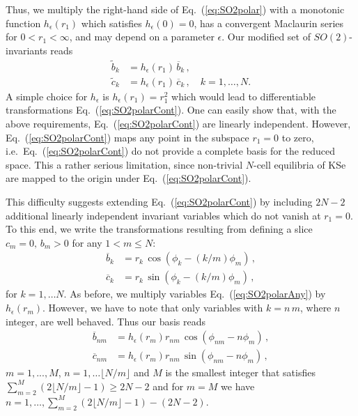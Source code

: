 \documentclass[aip,cha,showpacs,reprint]{revtex4-1} %
\newcommand{\bseq}{\begin{subequations}}
\newcommand{\eseq}{\end{subequations}}
\newcommand{\refeq}  [1] {Eq.~(\ref{#1})}                   %
\newcommand{\ie}{{i.e.}}
\begin{document}
Thus, we multiply the right-hand side of \refeq{eq:SO2polar} with a monotonic function
$h_\epsilon(r_1)$ which satisfies $h_\epsilon(0)=0$,
has a convergent Maclaurin series for $0<r_1<\infty$,
and may depend on a parameter $\epsilon$.
Our modified set of $SO(2)$-invariants reads
\bseq\label{eq:SO2polarCont}
  \begin{align}
    \tilde{b}_k &=
		    h_\epsilon(r_1)\,\overline{b}_k\,, \label{eq:SO2polarCont1}\\
    \tilde{c}_k &=
		    h_\epsilon(r_1)\,\overline{c}_k\,, \quad k=1,\ldots,N.\label{eq:SO2polarCont2}
  \end{align}
\eseq
A simple choice for $h_\epsilon$ is
$h_\epsilon(r_1)=r_1^2$ which would lead to differentiable transformations \refeq{eq:SO2polarCont}.
One can easily show that, with the above requirements,
\refeq{eq:SO2polarCont} are linearly independent. However,
\refeq{eq:SO2polarCont} maps any point in the subspace $r_1=0$ to zero, \ie\
\refeq{eq:SO2polarCont} do not provide a complete basis for the reduced space.
This a rather serious limitation, since non-trivial $N$-cell equilibria of
KSe are mapped to the origin under \refeq{eq:SO2polarCont}.

This difficulty suggests extending \refeq{eq:SO2polarCont} by including $2N-2$ additional linearly
independent invariant variables which do not vanish at $r_1=0$. To this end, we write
the transformations resulting from defining a slice $c_m=0,\, b_m>0$ for any $1<m\leq N$:
\bseq\label{eq:SO2polarAny}
  \begin{align}
    \overline{b}_k &=
		    r_k\, \cos\left(\phi_k-\left(k/m\right)\phi_m\right)\,, \label{eq:SO2polarAny1}\\
    \overline{c}_k &=
		    r_k\, \sin\left(\phi_k-\left(k/m\right)\phi_m\right)\,,\label{eq:SO2polarAny2}
  \end{align}
\eseq
for $k=1,\ldots N$. As before, we multiply variables \refeq{eq:SO2polarAny} by $h_\epsilon(r_m)$.
However, we have to note that only variables with $k=n\,m$, where $n$ integer, are well behaved.
Thus our basis reads
\bseq\label{eq:SO2polarExt}
\begin{align}
  \overline{b}_{nm} &=
		  h_\epsilon(r_m)r_{nm}\, \cos\left(\phi_{nm}-n\phi_m\right)\,, \label{eq:SO2polarAny1}\\
  \overline{c}_{nm} &=
		  h_\epsilon(r_m)r_{nm}\, \sin\left(\phi_{nm}-n\phi_m\right)\,,\label{eq:SO2polarAny2}
\end{align}
\eseq
$m=1,...,M$, $n=1,\ldots\lfloor N/m\rfloor$ and $M$ is the smallest integer that
satisfies $\sum_{m=2}^M(2\lfloor N/m\rfloor-1)\geq2N-2$ and for
$m=M$ we have $n=1,\ldots,\sum_{m=2}^M(2\lfloor N/m\rfloor-1)-(2N-2)$.
\end{document}
